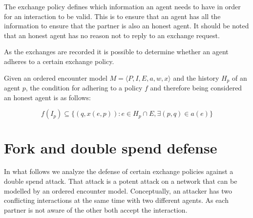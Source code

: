 The exchange policy defines which information an agent needs to have in order for an interaction to 
be valid. This is to ensure that an agent has all the information to ensure that the partner is also
an honest agent. It should be noted that an honest agent has no reason not to reply to an exchange 
request. 

As the exchanges are recorded it is possible to determine whether an agent adheres to a certain 
exchange policy. 

\begin{defn}
    Given an ordered encounter model $M = \langle P, I, E, a, w, x \rangle$ and the history $H_p$ of an
    agent $p$, the condition for adhering to a policy $f$ and
    therefore being considered an honest agent is as follows: 

    \begin{equation}
        f(I_p) \subseteq \{ (q, x(e, p)) : e \in H_p \cap E,  \exists (p, q) \in a(e)\}
    \end{equation}
\end{defn}






\section{Fork and double spend defense}
\label{sec:model_double_spend}
In what follows we analyze the defense of certain exchange policies against a double spend attack. 
That attack is a potent attack on a network that can be modelled by an ordered encounter model. 
Conceptually, an attacker 
has two conflicting interactions at the same time with two different agents. As each partner is not
aware of the other both accept the interaction. 

